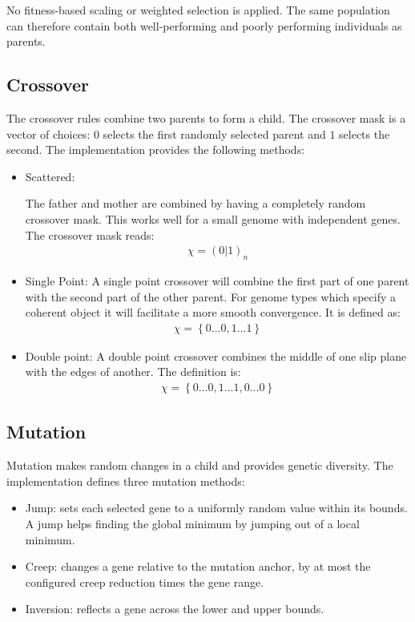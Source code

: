 No fitness-based scaling or weighted selection is applied.
The same population can therefore contain both well-performing and poorly performing individuals as parents.

\subsection{Crossover}

The crossover rules combine two parents to form a child.
The crossover mask is a vector of choices: $0$ selects the first randomly selected parent and $1$ selects the second.
The implementation provides the following methods:

\begin{itemize}
	\item Scattered:
	
	The father and mother are combined by having a completely random crossover mask.
	This works well for a small genome with independent genes. The crossover mask reads:
	\begin{align}
	\chi =\left( 0 | 1 \right)_{n}
	\end{align}
	
	\item Single Point:
	A single point crossover will combine the first part of one parent with the second part of the other parent.
	For genome types which specify a coherent object it will facilitate a more smooth convergence. It is defined as:
	\begin{align}
	\chi = \left\{0 ... 0, 1 ... 1\right\}
	\end{align}
	
	\item Double point:
	A double point crossover combines the middle of one slip plane with the edges of another. The definition is:
	\begin{align}
	\chi = \left\{0 ... 0, 1 ... 1, 0 ... 0\right\}
	\end{align}
	
\end{itemize}

\subsection{Mutation} 
\label{sec:Mutation}

Mutation makes random changes in a child and provides genetic diversity.
The implementation defines three mutation methods:

\begin{itemize}
	\item Jump: sets each selected gene to a uniformly random value within its bounds.
	A jump helps finding the global minimum by jumping out of a local minimum. 
	\item Creep: changes a gene relative to the mutation anchor, by at most the configured creep reduction times the gene range.
	\item Inversion: reflects a gene across the lower and upper bounds.
\end{itemize}

